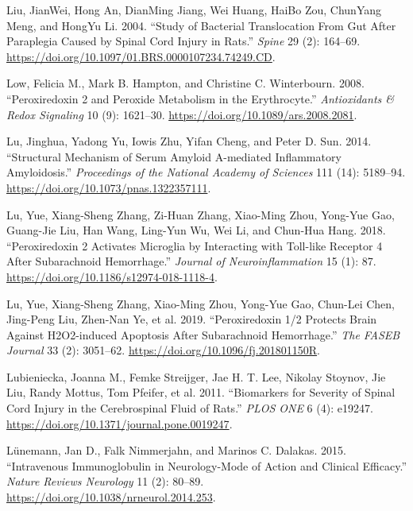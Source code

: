 \documentclass[9pt,lineno]{elife}
\newlength{\cslhangindent}
\newlength{\cslentryspacingunit} %
\newenvironment{CSLReferences}[2] %
 {%
  \setlength{\parindent}{0pt}
  \ifodd #1
  \let\oldpar\par
  \def\par{\hangindent=\cslhangindent\oldpar}
  \fi
  \setlength{\parskip}{#2\cslentryspacingunit}
 }%
 {}
\begin{document}
\begin{landscape}
\begin{landscape}
\begin{landscape}
\begin{landscape}
\begin{CSLReferences}{1}{0}
\leavevmode{}%
Liu, JianWei, Hong An, DianMing Jiang, Wei Huang, HaiBo Zou, ChunYang Meng, and HongYu Li. 2004. {``Study of {Bacterial Translocation From Gut After Paraplegia Caused} by {Spinal} Cord {Injury} in {Rats}.''} \emph{Spine} 29 (2): 164--69. \url{https://doi.org/10.1097/01.BRS.0000107234.74249.CD}.

\leavevmode{}%
Low, Felicia M., Mark B. Hampton, and Christine C. Winterbourn. 2008. {``Peroxiredoxin 2 and {Peroxide Metabolism} in the {Erythrocyte}.''} \emph{Antioxidants \& Redox Signaling} 10 (9): 1621--30. \url{https://doi.org/10.1089/ars.2008.2081}.

\leavevmode{}%
Lu, Jinghua, Yadong Yu, Iowis Zhu, Yifan Cheng, and Peter D. Sun. 2014. {``Structural Mechanism of Serum Amyloid {A-mediated} Inflammatory Amyloidosis.''} \emph{Proceedings of the National Academy of Sciences} 111 (14): 5189--94. \url{https://doi.org/10.1073/pnas.1322357111}.

\leavevmode{}%
Lu, Yue, Xiang-Sheng Zhang, Zi-Huan Zhang, Xiao-Ming Zhou, Yong-Yue Gao, Guang-Jie Liu, Han Wang, Ling-Yun Wu, Wei Li, and Chun-Hua Hang. 2018. {``Peroxiredoxin 2 Activates Microglia by Interacting with {Toll-like} Receptor 4 After Subarachnoid Hemorrhage.''} \emph{Journal of Neuroinflammation} 15 (1): 87. \url{https://doi.org/10.1186/s12974-018-1118-4}.

\leavevmode{}%
Lu, Yue, Xiang-Sheng Zhang, Xiao-Ming Zhou, Yong-Yue Gao, Chun-Lei Chen, Jing-Peng Liu, Zhen-Nan Ye, et al. 2019. {``Peroxiredoxin 1/2 Protects Brain Against {H2O2-induced} Apoptosis After Subarachnoid Hemorrhage.''} \emph{The FASEB Journal} 33 (2): 3051--62. \url{https://doi.org/10.1096/fj.201801150R}.

\leavevmode{}%
Lubieniecka, Joanna M., Femke Streijger, Jae H. T. Lee, Nikolay Stoynov, Jie Liu, Randy Mottus, Tom Pfeifer, et al. 2011. {``Biomarkers for {Severity} of {Spinal Cord Injury} in the {Cerebrospinal Fluid} of {Rats}.''} \emph{PLOS ONE} 6 (4): e19247. \url{https://doi.org/10.1371/journal.pone.0019247}.

\leavevmode{}%
Lünemann, Jan D., Falk Nimmerjahn, and Marinos C. Dalakas. 2015. {``Intravenous Immunoglobulin in Neurology-Mode of Action and Clinical Efficacy.''} \emph{Nature Reviews Neurology} 11 (2): 80--89. \url{https://doi.org/10.1038/nrneurol.2014.253}.


\end{CSLReferences}
\end{landscape}
\end{landscape}
\end{landscape}
\end{landscape}
\end{document}
